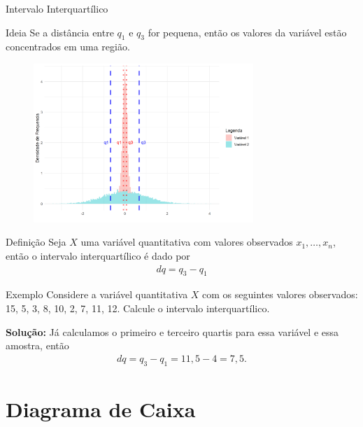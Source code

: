 \documentclass[8pt]{beamer}
\begin{document}
\begin{frame}{Intervalo Interquartílico}

\begin{block}{Ideia}
 Se a distância entre $q_1$ e $q_3$ for pequena, então os valores da variável estão concentrados em uma região. 
\end{block}

\begin{figure}
 \centering
  \includegraphics[height=6cm]{motivacao_dq.png}
\end{figure}

\end{frame}

\begin{frame}

\begin{block}{Definição}
 Seja $X$ uma variável quantitativa com valores observados $x_1, \dots, x_n$, então o intervalo interquartílico é dado por
 \begin{align*}
  dq = q_3-q_1
 \end{align*}
\end{block}


\begin{block}{Exemplo}
 Considere a variável quantitativa $X$ com os seguintes valores observados: 15, 5, 3, 8, 10, 2, 7, 11, 12. Calcule o intervalo interquartílico.
 
 \textbf{Solução:} Já calculamos o primeiro e terceiro quartis para essa variável e essa amostra, então
 \begin{align*}
  dq = q_3 - q_1= 11,5 - 4 = 7,5.
 \end{align*}
\end{block}
\end{frame}


\section{Diagrama de Caixa}
\end{document}
